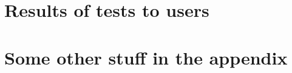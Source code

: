 \chapter{Results of tests to users}\label{ap:user_tests}

\chapter{Some other stuff in the appendix}\label{ap:stuff}

